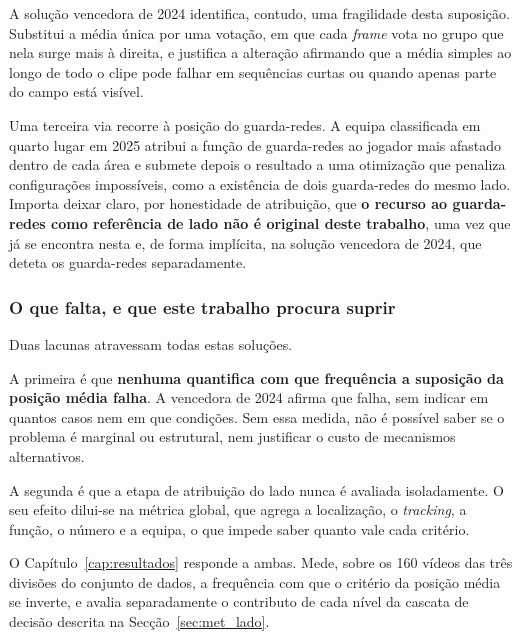 A solução vencedora de 2024 identifica, contudo, uma fragilidade desta suposição.
Substitui a média única por uma votação, em que cada \emph{frame} vota no grupo que nela
surge mais à direita, e justifica a alteração afirmando que a média simples ao longo de
todo o clipe pode falhar em sequências curtas ou quando apenas parte do campo está
visível.

Uma terceira via recorre à posição do guarda-redes. A equipa classificada em quarto
lugar em 2025 atribui a função de guarda-redes ao jogador mais afastado dentro de cada
área e submete depois o resultado a uma otimização que penaliza configurações
impossíveis, como a existência de dois guarda-redes do mesmo lado. Importa deixar claro,
por honestidade de atribuição, que \textbf{o recurso ao guarda-redes como referência de lado
não é original deste trabalho}, uma vez que já se encontra nesta e, de forma implícita,
na solução vencedora de 2024, que deteta os guarda-redes separadamente.

\subsubsection*{O que falta, e que este trabalho procura suprir}

Duas lacunas atravessam todas estas soluções.

A primeira é que \textbf{nenhuma quantifica com que frequência a suposição da posição média
falha}. A vencedora de 2024 afirma que falha, sem indicar em quantos casos nem em que
condições. Sem essa medida, não é possível saber se o problema é marginal ou estrutural,
nem justificar o custo de mecanismos alternativos.

A segunda é que a etapa de atribuição do lado nunca é avaliada isoladamente. O seu efeito
dilui-se na métrica global, que agrega a localização, o \emph{tracking}, a função, o
número e a equipa, o que impede saber quanto vale cada critério.

O Capítulo~\ref{cap:resultados} responde a ambas. Mede, sobre os 160 vídeos das três
divisões do conjunto de dados, a frequência com que o critério da posição média se
inverte, e avalia separadamente o contributo de cada nível da cascata de decisão
descrita na Secção~\ref{sec:met_lado}.
